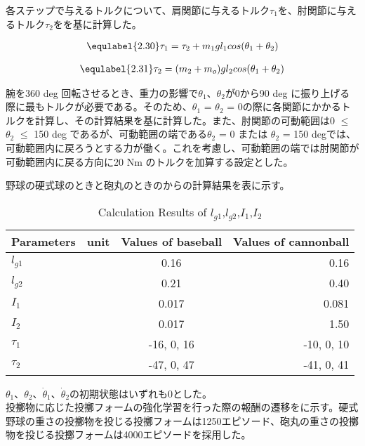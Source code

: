 各ステップで与えるトルクについて、肩関節に与えるトルク$\tau_{1}$を、肘関節に与えるトルク$\tau_{2}$をを基に計算した。

\begin{eqnarray}
  \equlabel{2.30}
  \tau_{1} = \tau_{2} + m_{1}gl_{1}cos(\theta_{1} + \theta_{2})
\end{eqnarray}

\begin{eqnarray}
  \equlabel{2.31}
  \tau_{2} = (m_{2} + m_{o})gl_{2}cos(\theta_{1} + \theta_{2})
\end{eqnarray}

腕を360 deg 回転させるとき、重力の影響で$\theta_{1}$、$\theta_{2}$が0から90 deg に振り上げる際に最もトルクが必要である。そのため、$\theta_{1}$ = $\theta_{2}$ = 0の際に各関節にかかるトルクを計算し、その計算結果を基に計算した。また、肘関節の可動範囲は0 $\le$ $\theta_{2}$ $\le$ 150 deg であるが、可動範囲の端である$\theta_{2}$ = 0 または $\theta_{2}$ = 150 degでは、可動範囲内に戻ろうとする力が働く。これを考慮し、可動範囲の端では肘関節が可動範囲内に戻る方向に20 Nm のトルクを加算する設定とした。

野球の硬式球のときと砲丸のときのからの計算結果を表に示す。
\begin{table}[tb]
  \begin{center}
    \caption{Calculation Results of $l_{g1}$,$l_{g2}$,$I_{1}$,$I_{2}$}
    \begin{tabular}{l|c|c|r}
      \hline
      Parameters & unit & Values of baseball & Values of cannonball \\
      \hline
      $l_{g1}$ & & 0.16 & 0.16 \\
      $l_{g2}$ & & 0.21 & 0.40 \\
      $I_{1}$ & & 0.017 & 0.081 \\
      $I_{2}$ & & 0.017 & 1.50 \\
      $\tau_{1}$ & & -16, 0, 16 & -10, 0, 10 \\
      $\tau_{2}$ & & -47, 0, 47 & -41, 0, 41 \\
      \hline
    \end{tabular}
  \end{center}
\end{table}
$\theta_{1}$、$\theta_{2}$、$\dot{\theta}_{1}$、$\dot{\theta}_{2}$の初期状態はいずれも0とした。\\

投擲物に応じた投擲フォームの強化学習を行った際の報酬の遷移をに示す。硬式野球の重さの投擲物を投じる投擲フォームは1250エピソード、砲丸の重さの投擲物を投じる投擲フォームは4000エピソードを採用した。

